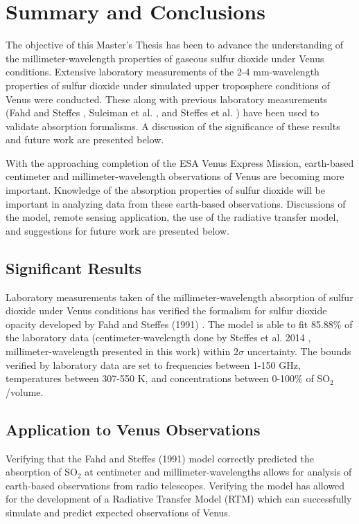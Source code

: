 \chapter{Summary and Conclusions}
The objective of this Master's Thesis has been to advance the understanding of the millimeter-wavelength properties of gaseous sulfur dioxide under Venus conditions. Extensive laboratory measurements of the 2-4 mm-wavelength properties of sulfur dioxide under simulated upper troposphere conditions of Venus were conducted. These along with previous laboratory measurements (Fahd and Steffes \cite{Fahd-1991}, Suleiman et al. \cite{Suleiman-1996}, and Steffes et al. \cite{Steffes-2014}) have been used to validate absorption formalisms. A discussion of the significance of these results and future work are presented below. 



With the approaching completion of the ESA Venus Express Mission, earth-based centimeter and millimeter-wavelength observations of Venus are becoming more important. Knowledge of the absorption properties of sulfur dioxide will be important in analyzing data from these earth-based observations. Discussions of the model, remote sensing application, the use of the radiative transfer model, and suggestions for future work are presented below.
\section{Significant Results}

Laboratory measurements taken of the millimeter-wavelength absorption of sulfur dioxide under Venus conditions has verified the formalism for sulfur dioxide opacity developed by Fahd and Steffes (1991) \cite{Fahd-1991}. The model is able to fit 85.88\% of the laboratory data (centimeter-wavelength done by Steffes et al. 2014 \cite{Steffes-2014}, millimeter-wavelength presented in this work) within $2\sigma$ uncertainty. The bounds verified by laboratory data are set to frequencies between 1-150 GHz, temperatures between 307-550 K, and concentrations between 0-100\% of SO$_2$/volume. 
\section{Application to Venus Observations}
Verifying that the Fahd and Steffes (1991) \cite{Fahd-1991} model correctly predicted the absorption of SO$_2$ at centimeter and millimeter-wavelengths allows for analysis of earth-based observations from radio telescopes. Verifying the model has allowed for the development of a Radiative Transfer Model (RTM) which can successfully simulate and predict expected observations of Venus. 

